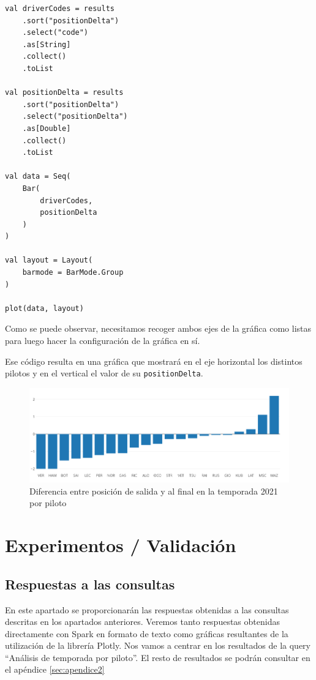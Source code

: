 \documentclass[12pt,twoside,titlepage]{report}
\newcommand{\quotes}[1]{``#1''}
\begin{document}
\begin{lstlisting}
val driverCodes = results
	.sort("positionDelta")
	.select("code")
	.as[String]
	.collect()
	.toList
	
val positionDelta = results
	.sort("positionDelta")
	.select("positionDelta")
	.as[Double]
	.collect()
	.toList
	
val data = Seq(
	Bar(
		driverCodes,  
		positionDelta
	)
)
	
val layout = Layout( 
	barmode = BarMode.Group
)
	
plot(data, layout)
\end{lstlisting}

Como se puede observar, necesitamos recoger ambos ejes de la gráfica como listas para luego hacer la configuración de la gráfica en sí.

Ese código resulta en una gráfica que mostrará en el eje horizontal los distintos pilotos y en el vertical el valor de su \texttt{positionDelta}.

\begin{figure}[H]
	\includegraphics[scale=0.4]{results/seasonanalysis/positionDelta.png}
	\centering
	\caption{Diferencia entre posición de salida y al final en la temporada 2021 por piloto}
	\label{fig:positionDelta}
	\centering
\end{figure}


\chapter{Experimentos / Validación}
\label{sec:expVal}
\newpage


\section{Respuestas a las consultas}

En este apartado se proporcionarán las respuestas obtenidas a las consultas descritas en los apartados anteriores. Veremos tanto respuestas obtenidas directamente con Spark en formato de texto como gráficas resultantes de la utilización de la librería Plotly. Nos vamos a centrar en los resultados de la query \quotes{Análisis de temporada por piloto}. El resto de resultados se podrán consultar en el apéndice \ref{sec:apendice2}
\end{document}
